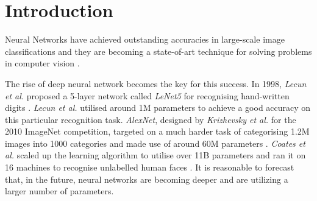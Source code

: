 \documentclass[a4paper,12pt]{report}
\begin{document}
\pagestyle{empty}
\singlespacing

\onehalfspacing

\singlespacing


\setcounter{page}{0}
\pagestyle{plain}
\tableofcontents
\listoffigures
\listoftables

\onehalfspacing


\chapter{Introduction}
\setcounter{page}{1}

Neural Networks have achieved outstanding accuracies in large-scale
image classifications and they are becoming a state-of-art technique for
solving problems in computer vision  \cite{Lecun1998gradient,
Krizhevsky, Szegedy}.

The rise of deep neural network becomes the key for this success.
In 1998, \textit{Lecun et al.} proposed a 5-layer network called \textit{LeNet5}
for recognising hand-written digits \cite{Lecun1998gradient}.
\textit{Lecun et al.} utilised around 1M parameters to achieve a good accuracy on
this particular recognition task.
\textit{AlexNet}, designed by \textit{Krizhevsky et al.} for the 2010 ImageNet
competition, targeted on a much harder task of categorising 1.2M images into
1000 categories and made use of around 60M parameters \cite{Krizhevsky}.
\textit{Coates et al.} scaled up the learning algorithm to utilise over
11B parameters and ran it on 16 machines to recognise unlabelled human
faces \cite{Coates}.
It is reasonable to forecast that, in the future, neural networks are becoming
deeper and are utilizing a larger number of parameters.
\end{document}
